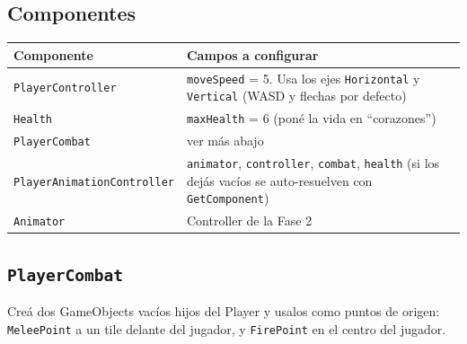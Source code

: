 \documentclass[a4paper,12pt]{article}
\newcommand{\code}[1]{\texttt{#1}}
\begin{document}
\subsection{Componentes}

\begin{center}
\begin{longtable}{|l|p{8.6cm}|}
\hline
\textbf{Componente} & \textbf{Campos a configurar} \\
\hline
\endhead
\code{PlayerController} & \code{moveSpeed} = 5. Usa los ejes \code{Horizontal} y \code{Vertical} (WASD y flechas por defecto) \\
\hline
\code{Health} & \code{maxHealth} = 6 (poné la vida en ``corazones'') \\
\hline
\code{PlayerCombat} & ver más abajo \\
\hline
\code{PlayerAnimationController} & \code{animator}, \code{controller}, \code{combat}, \code{health} (si los dejás vacíos se auto-resuelven con \code{GetComponent}) \\
\hline
\code{Animator} & Controller de la Fase 2 \\
\hline
\end{longtable}
\end{center}

\subsection{\code{PlayerCombat}}

Creá dos GameObjects vacíos hijos del Player y usalos como puntos de origen: \code{MeleePoint} a
un tile delante del jugador, y \code{FirePoint} en el centro del jugador.
\end{document}
